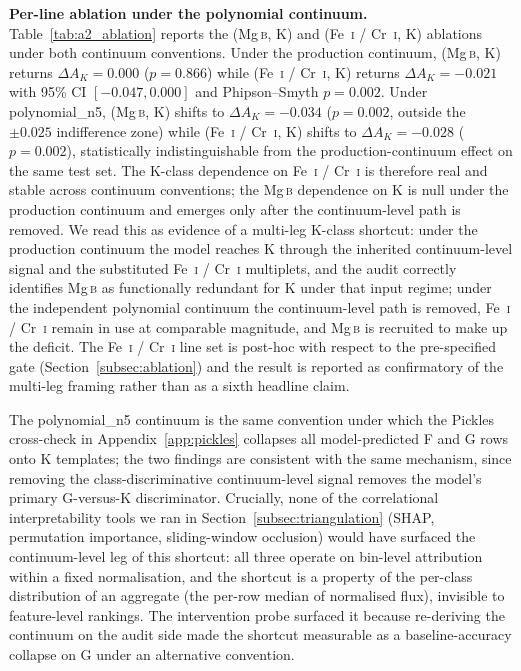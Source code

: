 \documentclass[11pt,a4paper]{article}
\newcommand{\Mgb}{Mg\,\textsc{b}\xspace}
\newcommand{\dA}{\Delta A}
\begin{document}
\textbf{Per-line ablation under the polynomial continuum.} Table~\ref{tab:a2_ablation} reports the (\Mgb, K) and (Fe~\textsc{i} / Cr~\textsc{i}, K) ablations under both continuum conventions. Under the production continuum, (\Mgb, K) returns $\dA_K = 0.000$ ($p = 0.866$) while (Fe~\textsc{i} / Cr~\textsc{i}, K) returns $\dA_K = -0.021$ with 95\% CI $[-0.047, 0.000]$ and Phipson--Smyth $p = 0.002$. Under polynomial\_n5, (\Mgb, K) shifts to $\dA_K = -0.034$ ($p = 0.002$, outside the $\pm 0.025$ indifference zone) while (Fe~\textsc{i} / Cr~\textsc{i}, K) shifts to $\dA_K = -0.028$ ($p = 0.002$), statistically indistinguishable from the production-continuum effect on the same test set. The K-class dependence on Fe~\textsc{i} / Cr~\textsc{i} is therefore real and stable across continuum conventions; the \Mgb dependence on K is null under the production continuum and emerges only after the continuum-level path is removed. We read this as evidence of a multi-leg K-class shortcut: under the production continuum the model reaches K through the inherited continuum-level signal and the substituted Fe~\textsc{i} / Cr~\textsc{i} multiplets, and the audit correctly identifies \Mgb as functionally redundant for K under that input regime; under the independent polynomial continuum the continuum-level path is removed, Fe~\textsc{i} / Cr~\textsc{i} remain in use at comparable magnitude, and \Mgb is recruited to make up the deficit. The Fe~\textsc{i} / Cr~\textsc{i} line set is post-hoc with respect to the pre-specified gate (Section~\ref{subsec:ablation}) and the result is reported as confirmatory of the multi-leg framing rather than as a sixth headline claim.

The polynomial\_n5 continuum is the same convention under which the Pickles cross-check in Appendix~\ref{app:pickles} collapses all model-predicted F and G rows onto K templates; the two findings are consistent with the same mechanism, since removing the class-discriminative continuum-level signal removes the model's primary G-versus-K discriminator. Crucially, none of the correlational interpretability tools we ran in Section~\ref{subsec:triangulation} (SHAP, permutation importance, sliding-window occlusion) would have surfaced the continuum-level leg of this shortcut: all three operate on bin-level attribution within a fixed normalisation, and the shortcut is a property of the per-class distribution of an aggregate (the per-row median of normalised flux), invisible to feature-level rankings. The intervention probe surfaced it because re-deriving the continuum on the audit side made the shortcut measurable as a baseline-accuracy collapse on G under an alternative convention.
\end{document}
